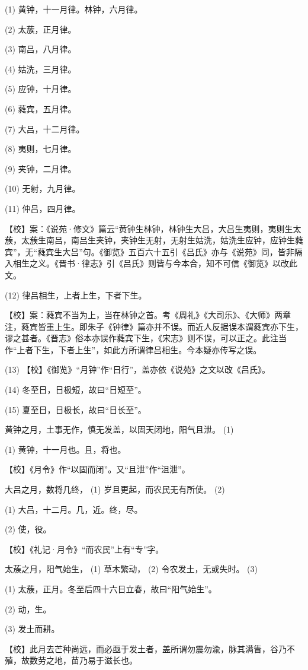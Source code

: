 \documentclass[12pt,UTF8]{ctexbook}
\begin{document}
(1) 黄钟，十一月律。林钟，六月律。

(2) 太蔟，正月律。

(3) 南吕，八月律。

(4) 姑洗，三月律。

(5) 应钟，十月律。

(6) 蕤宾，五月律。

(7) 大吕，十二月律。

(8) 夷则，七月律。

(9) 夹钟，二月律。

(10) 无射，九月律。

(11) 仲吕，四月律。

【校】案：《说苑·修文》篇云“黄钟生林钟，林钟生大吕，大吕生夷则，夷则生太蔟，太蔟生南吕，南吕生夹钟，夹钟生无射，无射生姑洗，姑洗生应钟，应钟生蕤宾”，无“蕤宾生大吕”句。《御览》五百六十五引《吕氏》亦与《说苑》同，皆非隔入相生之义。《晋书·律志》引《吕氏》则皆与今本合，知不可信《御览》以改此文。

(12) 律吕相生，上者上生，下者下生。

【校】案：蕤宾不当为上，当在林钟之首。考《周礼》《大司乐》、《大师》两章注，蕤宾皆重上生。即朱子《钟律》篇亦并不误。而近人反据误本谓蕤宾亦下生，谬之甚者。《晋志》俗本亦误作蕤宾下生，《宋志》则不误，可以正之。此注当作“上者下生，下者上生”，如此方所谓律吕相生。今本疑亦传写之误。

(13) 【校】《御览》“月钟”作“日行”，盖亦依《说苑》之文以改《吕氏》。

(14) 冬至日，日极短，故曰“日短至”。

(15) 夏至日，日极长，故曰“日长至”。

黄钟之月，土事无作，慎无发盖，以固天闭地，阳气且泄。 (1)

(1) 黄钟，十一月也。且，将也。

【校】《月令》作“以固而闭”。又“且泄”作“沮泄”。

大吕之月，数将几终， (1) 岁且更起，而农民无有所使。 (2)

(1) 大吕，十二月。几，近。终，尽。

(2) 使，役。

【校】《礼记·月令》“而农民”上有“专”字。

太蔟之月，阳气始生， (1) 草木繁动， (2) 令农发土，无或失时。 (3)

(1) 太蔟，正月。冬至后四十六日立春，故曰“阳气始生”。

(2) 动，生。

(3) 发土而耕。

【校】此月去芒种尚远，而必亟于发土者，盖所谓勿震勿渝，脉其满眚，谷乃不殖，故数劳之地，苗乃易于滋长也。
\end{document}
